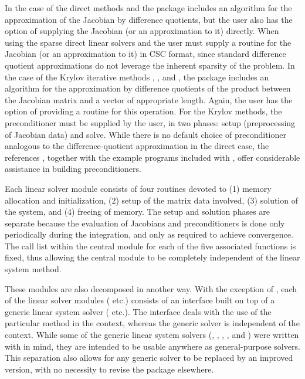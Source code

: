 In the case of the direct methods {\cvdense} and {\cvband}
the package includes an algorithm for the approximation of the Jacobian by difference
quotients, but the user also has the option of supplying the Jacobian
(or an approximation to it) directly.  When using the sparse direct
linear solvers {\cvklu} and {\cvsuperlumt} the user must supply a
routine for the Jacobian (or an approximation to it) in CSC format,
since standard difference quotient approximations do not leverage the
inherent sparsity of the problem. In the case of the Krylov iterative
methods {\cvspgmr}, {\cvspbcg}, and {\cvsptfqmr}, the package includes an algorithm
for the approximation by difference quotients of the product between the Jacobian
matrix and a vector of appropriate length. Again, the user has the option of
providing a routine for this operation.
For the Krylov methods, 
the preconditioner must be supplied by the user, in two phases: 
setup (preprocessing of Jacobian data) and solve.
While there is no default choice of
preconditioner analogous to the difference-quotient approximation
in the direct case, the references \cite{BrHi:89, Byr:92},
together with the example programs included with {\cvodes}, offer
considerable assistance in building preconditioners.

Each {\cvodes} linear solver module consists of four routines devoted to (1)
memory allocation and initialization, (2) setup of the matrix data
involved, (3) solution of the system, and (4) freeing of memory.  
The setup and solution phases are separate because the evaluation of
Jacobians and preconditioners is done only periodically during the
integration, and only as required to achieve convergence. The call list within
the central {\cvodes} module for each of the five associated functions is
fixed, thus allowing the central module to be completely independent
of the linear system method.

These modules are also decomposed in another way.
With the exception of {\cvdiag}, each of the linear solver modules
({\cvdense} etc.) consists of an interface built on top of a generic linear
system solver ({\dense} etc.).  The interface deals with the use of the
particular method in the {\cvodes} context, whereas the generic solver is
independent of the context.  While some of the generic linear system solvers
({\dense}, {\band}, {\spgmr}, {\spbcg}, and {\sptfqmr}) were written with
{\sundials} in mind, they are intended to be usable anywhere as general-purpose
solvers.  This separation also allows for any generic solver to be replaced by
an improved version, with no necessity to revise the {\cvodes} package elsewhere.


